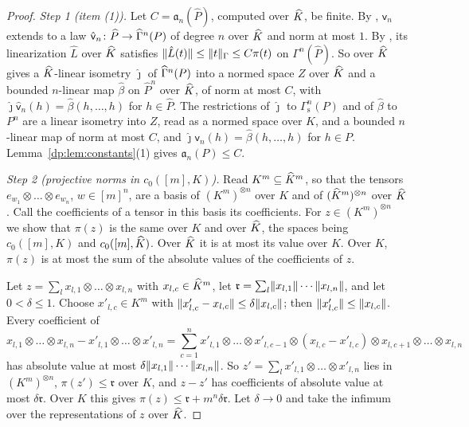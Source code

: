 \begin{proof}
\emph{Step 1 (item (1)).} Let $C=\mathfrak a_n(\widehat P)$, computed over $\widehat K$, be finite. By \cite[Lemma~Q.13(1)]{I}, $\mathsf v_n$ extends to a law $\hat{\mathsf v}_n\colon\widehat P\to\widehat\Gamma^n(P)$ of degree $n$ over $\widehat K$ and norm at most $1$. By \cite[Lemma~Q.1(1)]{I}, its linearization $\hat L$ over $\widehat K$ satisfies $\lVert \hat L(t)\rVert\le\lVert t\rVert_\Gamma\le C\pi(t)$ on $\Gamma^n(\widehat P)$. So \cite[Lemma~Q.1(4)]{I} over $\widehat K$ gives a $\widehat K$\nobreakdash-linear isometry $\hat\jmath$ of $\widehat\Gamma^n(P)$ into a normed space $Z$ over $\widehat K$ and a bounded $n$\nobreakdash-linear map $\hat\beta$ on $\widehat P^n$ over $\widehat K$, of norm at most $C$, with $\hat\jmath\hat{\mathsf v}_n(h)=\hat\beta(h,\dots,h)$ for $h\in\widehat P$. The restrictions of $\hat\jmath$ to $\Gamma^n_{\mathrm s}(P)$ and of $\hat\beta$ to $P^n$ are a linear isometry into $Z$, read as a normed space over $K$, and a bounded $n$\nobreakdash-linear map of norm at most $C$, and $\hat\jmath\mathsf v_n(h)=\hat\beta(h,\dots,h)$ for $h\in P$. Lemma~\ref{dp:lem:constants}(1) gives $\mathfrak a_n(P)\le C$.

\emph{Step 2 (projective norms in $c_0([m],K)$).} Read $K^m\subseteq\widehat K^m$, so that the tensors $e_{w_1}\otimes\dots\otimes e_{w_n}$, $w\in[m]^n$, are a basis of $(K^m)^{\otimes n}$ over $K$ and of $(\widehat K^m)^{\otimes n}$ over $\widehat K$. Call the coefficients of a tensor in this basis its coefficients. For $z\in(K^m)^{\otimes n}$ we show that $\pi(z)$ is the same over $K$ and over $\widehat K$, the spaces being $c_0([m],K)$ and $c_0([m],\widehat K)$. Over $\widehat K$ it is at most its value over $K$. Over $K$, $\pi(z)$ is at most the sum of the absolute values of the coefficients of $z$.

Let $z=\sum_lx_{l,1}\otimes\dots\otimes x_{l,n}$ with $x_{l,c}\in\widehat K^m$, let $\mathfrak r=\sum_l\lVert x_{l,1}\rVert\cdots\lVert x_{l,n}\rVert$, and let $0<\delta\le1$. Choose $x'_{l,c}\in K^m$ with $\lVert x'_{l,c}-x_{l,c}\rVert\le\delta\lVert x_{l,c}\rVert$; then $\lVert x'_{l,c}\rVert\le\lVert x_{l,c}\rVert$. Every coefficient of
\[
 x_{l,1}\otimes\dots\otimes x_{l,n}-x'_{l,1}\otimes\dots\otimes x'_{l,n}
 =\sum_{c=1}^nx'_{l,1}\otimes\dots\otimes x'_{l,c-1}\otimes(x_{l,c}-x'_{l,c})\otimes x_{l,c+1}\otimes\dots\otimes x_{l,n}
\]
has absolute value at most $\delta\lVert x_{l,1}\rVert\cdots\lVert x_{l,n}\rVert$. So $z'=\sum_lx'_{l,1}\otimes\dots\otimes x'_{l,n}$ lies in $(K^m)^{\otimes n}$, $\pi(z')\le\mathfrak r$ over $K$, and $z-z'$ has coefficients of absolute value at most $\delta\mathfrak r$. Over $K$ this gives $\pi(z)\le\mathfrak r+m^n\delta\mathfrak r$. Let $\delta\to0$ and take the infimum over the representations of $z$ over $\widehat K$.


\end{proof}
